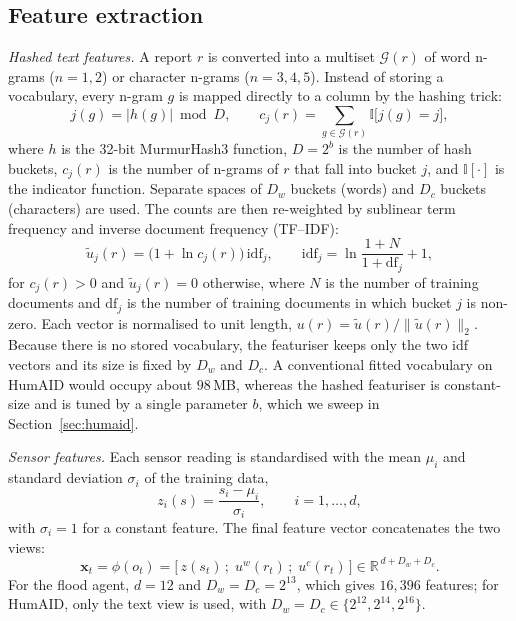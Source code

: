 \documentclass[journal]{IEEEtran}
\begin{document}
\subsection{Feature extraction}\label{sec:features}
\textit{Hashed text features.} A report $r$ is converted into a multiset
$\mathcal{G}(r)$ of word n-grams ($n=1,2$) or character n-grams ($n=3,4,5$).
Instead of storing a vocabulary, every n-gram $g$ is mapped directly to a column
by the hashing trick:
\begin{equation}
j(g)=\big|h(g)\big| \bmod D, \qquad
c_j(r)=\sum_{g\in\mathcal{G}(r)}\mathbb{I}\big[j(g)=j\big],
\label{eq:hash}
\end{equation}
where $h$ is the 32-bit MurmurHash3 function, $D=2^{b}$ is the number of hash
buckets, $c_j(r)$ is the number of n-grams of $r$ that fall into bucket $j$,
and $\mathbb{I}[\cdot]$ is the indicator function. Separate spaces of $D_w$
buckets (words) and $D_c$ buckets (characters) are used. The counts are then
re-weighted by sublinear term frequency and inverse document frequency (TF--IDF):
\begin{equation}
\tilde{u}_j(r)=\big(1+\ln c_j(r)\big)\,\mathrm{idf}_j,\qquad
\mathrm{idf}_j=\ln\frac{1+N}{1+\mathrm{df}_j}+1,
\label{eq:tfidf}
\end{equation}
for $c_j(r)>0$ and $\tilde{u}_j(r)=0$ otherwise, where $N$ is the number of
training documents and $\mathrm{df}_j$ is the number of training documents in
which bucket $j$ is non-zero. Each vector is normalised to unit length,
$u(r)=\tilde{u}(r)/\|\tilde{u}(r)\|_2$. Because there is no stored vocabulary,
the featuriser keeps only the two $\mathrm{idf}$ vectors and its size is fixed
by $D_w$ and $D_c$. A conventional fitted vocabulary on HumAID would occupy
about $98$\,MB, whereas the hashed featuriser is constant-size and is tuned by a
single parameter $b$, which we sweep in Section~\ref{sec:humaid}.

\textit{Sensor features.} Each sensor reading is standardised with the mean
$\mu_i$ and standard deviation $\sigma_i$ of the training data,
\begin{equation}
z_i(s)=\frac{s_i-\mu_i}{\sigma_i},\qquad i=1,\dots,d,
\label{eq:zscore}
\end{equation}
with $\sigma_i=1$ for a constant feature. The final feature vector concatenates
the two views:
\begin{equation}
\mathbf{x}_t=\phi(o_t)=\big[\,z(s_t)\,;\;u^{w}(r_t)\,;\;u^{c}(r_t)\,\big]
\in\mathbb{R}^{\,d+D_w+D_c}.
\label{eq:fusion}
\end{equation}
For the flood agent, $d=12$ and $D_w=D_c=2^{13}$, which gives $16{,}396$
features; for HumAID, only the text view is used, with $D_w=D_c\in\{2^{12},
2^{14},2^{16}\}$.
\end{document}
